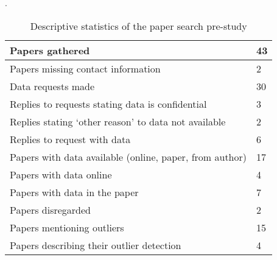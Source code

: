 \begin{table}.
  \caption{Descriptive statistics of the paper search pre-study}
  \label{tab:resultsprestudy-descstat}
  \centering
  {\small
  \begin{tabular}{ll}
    \hline
    Papers gathered & 43 \\
    \hline
    Papers missing contact information & 2 \\
    \hline
    Data requests made & 30 \\
    \hline
    Replies to requests stating data is confidential & 3 \\
    \hline
    Replies stating `other reason' to data not available & 2  \\
    \hline
    Replies to request with data & 6 \\
    \hline
    Papers with data available (online, paper, from author) & 17 \\
    \hline
    Papers with data online & 4 \\
    \hline
    Papers with data in the paper & 7 \\
    \hline
    Papers disregarded & 2 \\
    \hline
    Papers mentioning outliers & 15 \\
    \hline
    Papers describing their outlier detection & 4 \\
    \hline
  \end{tabular}
  }
\end{table}
